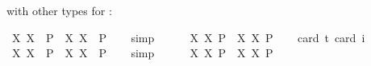 \begin{isabellebody}
\begin{isamarkuptext}
with other types for :%
\end{isamarkuptext}\isamarkuptrue%
\isamarkupfalse%
\ {\isachardoublequoteopen}{\isasymlfloor}{\isacharparenleft}{\isasymlambda}X{\isachardot}\ \isactrlbold {\isasymdiamond}\isactrlbold {\isasymexists}X{\isacharparenright}\ \ {\isacharparenleft}P{\isacharcolon}{\isacharcolon}{\isasymup}{\isasymlangle}{\isasymup}{\isasymzero}{\isasymrangle}{\isacharparenright}\ \isactrlbold {\isasymrightarrow}\ \isactrlbold {\isasymdiamond}{\isacharparenleft}{\isacharparenleft}{\isasymlambda}X{\isachardot}\ \isactrlbold {\isasymexists}X{\isacharparenright}\ \ P{\isacharparenright}{\isasymrfloor}{\isachardoublequoteclose}%
\ \ %
%
\isamarkupfalse%
\ simp%
%
%
\ \ \ \ \isanewline
{}\isamarkupfalse%
\ {\isachardoublequoteopen}{\isasymlfloor}{\isacharparenleft}{\isasymlambda}X{\isachardot}\ \isactrlbold {\isasymdiamond}\isactrlbold {\isasymexists}X{\isacharparenright}\ \isactrlbold {\isasymdown}{\isacharparenleft}P{\isacharcolon}{\isacharcolon}{\isasymup}{\isasymlangle}{\isasymup}{\isasymzero}{\isasymrangle}{\isacharparenright}\ \isactrlbold {\isasymrightarrow}\ \isactrlbold {\isasymdiamond}{\isacharparenleft}{\isacharparenleft}{\isasymlambda}X{\isachardot}\ \isactrlbold {\isasymexists}X{\isacharparenright}\ \isactrlbold {\isasymdown}P{\isacharparenright}{\isasymrfloor}{\isachardoublequoteclose}\ \isanewline
\ \ \isamarkupfalse%
{\isacharbrackleft}card\ {\isacharprime}t{\isacharequal}{}{\isacharcomma}\ card\ i{\isacharequal}{}{\isacharbrackright}%
\ %
%
\isamarkupfalse%
\ %
%
%
%
\isanewline
{}\isamarkupfalse%
\ {\isachardoublequoteopen}{\isasymlfloor}{\isacharparenleft}{\isasymlambda}X{\isachardot}\ \isactrlbold {\isasymdiamond}\isactrlbold {\isasymexists}X{\isacharparenright}\ \ {\isacharparenleft}P{\isacharcolon}{\isacharcolon}{\isasymup}{\isasymlangle}{\isasymlangle}{\isasymzero}{\isasymrangle}{\isasymrangle}{\isacharparenright}\ \isactrlbold {\isasymrightarrow}\ \isactrlbold {\isasymdiamond}{\isacharparenleft}{\isacharparenleft}{\isasymlambda}X{\isachardot}\ \isactrlbold {\isasymexists}X{\isacharparenright}\ \ P{\isacharparenright}{\isasymrfloor}{\isachardoublequoteclose}%
\ \ %
%
\isamarkupfalse%
\ simp%
%
%
\ \ \ \ \isanewline
{}\isamarkupfalse%
\ {\isachardoublequoteopen}{\isasymlfloor}{\isacharparenleft}{\isasymlambda}X{\isachardot}\ \isactrlbold {\isasymdiamond}\isactrlbold {\isasymexists}X{\isacharparenright}\ \isactrlbold {\isasymdown}{\isacharparenleft}P{\isacharcolon}{\isacharcolon}{\isasymup}{\isasymlangle}{\isasymlangle}{\isasymzero}{\isasymrangle}{\isasymrangle}{\isacharparenright}\ \isactrlbold {\isasymrightarrow}\ \isactrlbold {\isasymdiamond}{\isacharparenleft}{\isacharparenleft}{\isasymlambda}X{\isachardot}\ \isactrlbold {\isasymexists}X{\isacharparenright}\ \isactrlbold {\isasymdown}P{\isacharparenright}{\isasymrfloor}{\isachardoublequoteclose}\ \isanewline

\end{isabellebody}
